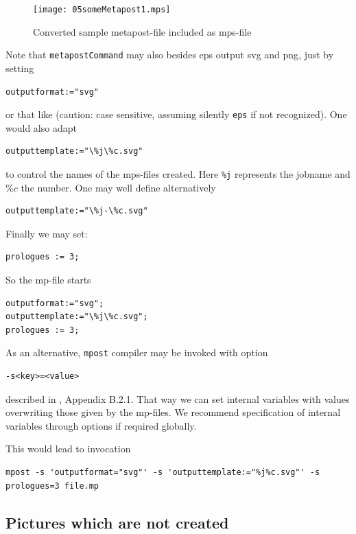 \documentclass[12pt]{article}
\begin{document}
\begin{figure}[htb]
\begin{center}
\texttt{[image: 05someMetapost1.mps]}
\end{center}
\caption{\label{fig:metapost}
Converted sample metapost-file included as mps-file  }
\end{figure}

Note that {\tt metapostCommand} may also besides \gls{eps} 
output \gls{svg} and \gls{png}, 
just by setting 
%
\begin{verbatim}
outputformat:="svg" 
\end{verbatim}
%
or that like 
(caution: case sensitive, assuming silently {\tt eps} if not recognized). 
One would also adapt 
%
\begin{verbatim}
outputtemplate:="\%j\%c.svg"
\end{verbatim}
%
to control the names of the mps-files created. 
Here {\tt\%j} represents the jobname and $\%c$ the number. 
One may well define alternatively 
%
\begin{verbatim}
outputtemplate:="\%j-\%c.svg"
\end{verbatim}

Finally we may set: 
%
\begin{verbatim}
prologues := 3;
\end{verbatim}

So the mp-file starts 
%
\lstset{language=metapost, basicstyle=\normalsize}
\begin{lstlisting}
outputformat:="svg";
outputtemplate:="\%j\%c.svg";
prologues := 3;
\end{lstlisting}

As an alternative, {\tt mpost} compiler may be invoked with option 
%
\begin{verbatim}
-s<key>=<value>
\end{verbatim}
%
described in \cite{MPost}, Appendix B.2.1. 
That way we can set internal variables with values 
overwriting those given by the mp-files. 
We recommend specification of internal variables through options 
if required globally. 

This would lead to invocation 
%
\begin{Verbatim}[fontsize=\scriptsize]
mpost -s 'outputformat="svg"' -s 'outputtemplate:="%j%c.svg"' -s prologues=3 file.mp
\end{Verbatim}



\subsection{Pictures which are not created}\label{subsec:picasis}
\end{document}
